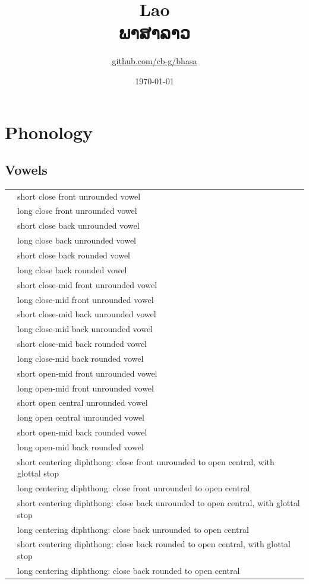 \documentclass{article}
\title{Lao\\{\laofont ພາສາລາວ}\\\ipa{[p\super ha:\tone{45}sa:\tone{24}la:w\tone{45}]}}
\author{\href{https://github.com/cb-g/bhasa}{github.com/cb-g/bhasa}}
\date{\today}
\begin{document}
\pagecolor{custom_bg}\color{custom_fg}
\maketitle\thispagestyle{empty}

\newpage\setcounter{page}{1}\section{Phonology}

\subsection{Vowels}

\begin{xltabular}{\textwidth}{lL}
   & short close front unrounded vowel \\
   & long close front unrounded vowel \\
   & short close back unrounded vowel \\
   & long close back unrounded vowel \\
   & short close back rounded vowel \\
   & long close back rounded vowel \\
   & short close-mid front unrounded vowel \\
   & long close-mid front unrounded vowel \\
   & short close-mid back unrounded vowel \\
   & long close-mid back unrounded vowel \\
   & short close-mid back rounded vowel \\
   & long close-mid back rounded vowel \\
   & short open-mid front unrounded vowel \\
   & long open-mid front unrounded vowel \\
   & short open central unrounded vowel \\
   & long open central unrounded vowel \\
   & short open-mid back rounded vowel \\
   & long open-mid back rounded vowel \\
   & short centering diphthong: close front unrounded to open central, with glottal stop \\
   & long centering diphthong: close front unrounded to open central \\
   & short centering diphthong: close back unrounded to open central, with glottal stop \\
   & long centering diphthong: close back unrounded to open central \\
   & short centering diphthong: close back rounded to open central, with glottal stop \\
   & long centering diphthong: close back rounded to open central \\
\end{xltabular}
\end{document}
